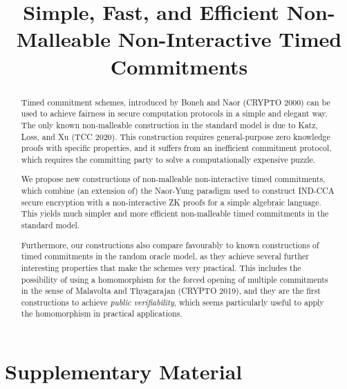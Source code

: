 \documentclass{llncs}
\author{\vspace{-5mm}}
\institute{\vspace{-5mm}}
\begin{document}
\title{Simple, Fast, and Efficient Non-Malleable Non-Interactive Timed Commitments}


\maketitle
\begin{abstract}
Timed commitment schemes, introduced by Boneh and Naor (CRYPTO 2000) can be used to achieve fairness in secure computation protocols in a simple and elegant way.
The only known non-malleable construction in the standard model is due to Katz, Loss, and Xu (TCC 2020). This construction requires general-purpose zero knowledge proofs with specific properties, and it suffers from an inefficient commitment protocol, which requires the committing party to solve a computationally expensive puzzle.

We propose new constructions of non-malleable non-interactive timed commitments, which combine (an extension of) the Naor-Yung paradigm used to construct IND-CCA secure encryption with a non-interactive ZK proofs for a simple algebraic language. This yields much simpler and more efficient non-malleable timed commitments in the standard model.

Furthermore, our constructions also compare favourably to known constructions of timed commitments in the random oracle model, as they achieve several further interesting properties that make the schemes very practical. This includes the possibility of using a homomorphism for the forced opening of multiple commitments in the sense of Malavolta and Thyagarajan (CRYPTO 2019), and they are the first constructions to achieve \emph{public verifiability}, which seems particularly useful to apply the homomorphism in practical applications.
\end{abstract}


















\appendix
\chapter*{Supplementary Material}
%



\end{document}
